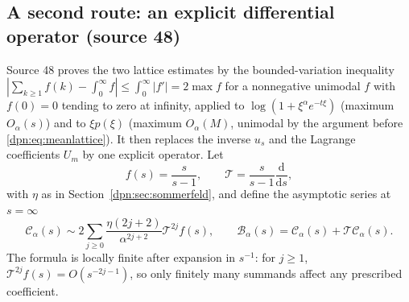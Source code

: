 \documentclass[11pt]{article}
\numberwithin{equation}{section}
\theoremstyle{definition}\newtheorem{definition}[theorem]{Definition}
\theoremstyle{remark}\newtheorem{remark}[theorem]{Remark}
\newcommand{\src}[1]{\textup{(source #1)}}
\newcommand{\Cop}{\mathcal C_\alpha}
\newcommand{\Bop}{\mathcal B_\alpha}
\newcommand{\Top}{\mathcal T}
\begin{document}
\subsection{A second route: an explicit differential operator \src{48}}\label{dpn:48:sec:operator}
Source 48 proves the two lattice estimates by the bounded-variation inequality
$|\sum_{k\ge1}f(k)-\int_0^\infty f|\le\int_0^\infty|f'|=2\max f$ for a
nonnegative unimodal $f$ with $f(0)=0$ tending to zero at infinity, applied to
$\log(1+\xi^\alpha e^{-t\xi})$ (maximum $O_\alpha(s)$) and to $\xi p(\xi)$
(maximum $O_\alpha(M)$, unimodal by the argument before
\eqref{dpn:eq:meanlattice}).  It then replaces the inverse $u_s$ and the
Lagrange coefficients $U_m$ by one explicit operator.  Let
\begin{equation}\label{dpn:48:eq:operator}
 f(s)=\frac{s}{s-1},\qquad
 \Top=\frac{s}{s-1}\frac{\mathrm d}{\mathrm ds},
\end{equation}
with $\eta$ as in Section~\ref{dpn:sec:sommerfeld}, and define the asymptotic
series at $s=\infty$
\begin{equation}\label{dpn:48:eq:Cs}
 \boxed{\displaystyle
 \Cop(s)\sim2\sum_{j\ge0}
       \frac{\eta(2j+2)}{\alpha^{2j+2}}\Top^{2j}f(s),
 \qquad \Bop(s)=\Cop(s)+\Top\Cop(s).}
\end{equation}
The formula is locally finite after expansion in $s^{-1}$: for $j\ge1$,
$\Top^{2j}f(s)=O(s^{-2j-1})$, so only finitely many summands affect any
prescribed coefficient.
\end{document}
